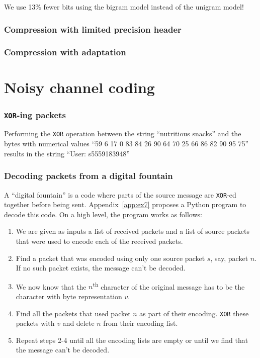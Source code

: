 \documentclass[10pt,a4paper,oneside,onecolumn]{article}
\newcommand*{\XOR}{{\tt XOR}\xspace}
\begin{document}
We use 13\% fewer bits using the bigram model instead of the unigram model!

\section{Compression with limited precision header}\label{sec:ex4}
\section{Compression with adaptation}\label{sec:ex5}


\part{Noisy channel coding}

\section{\XOR-ing packets}\label{sec:ex6}

Performing the \XOR operation between the string ``nutritious snacks'' and the
bytes with numerical values ``59 6 17 0 83 84 26 90 64 70 25 66 86 82 90 95 75''
results in the string ``User: s5559183948''

\section{Decoding packets from a digital fountain}\label{sec:ex7}

A ``digital fountain'' is a code where parts of the source message are \XOR-ed
together before being sent. Appendix~\ref{app:ex7} proposes a Python program to
decode this code. On a high level, the program works as follows:

\begin{enumerate}
\item We are given as inputs a list of received packets and a list of source
      packets that were used to encode each of the received packets.
\item Find a packet that was encoded using only one source packet $s$, say,
      packet $n$.  If no such packet exists, the message can't be decoded.
\item We now know that the $n$\textsuperscript{th} character of the original
      message has to be the character with byte representation $v$.
\item Find all the packets that used packet $n$ as part of their encoding.
      \XOR these packets with $v$ and delete $n$ from their encoding list.
\item Repeat steps 2-4 until all the encoding lists are empty or until we find
      that the message can't be decoded.
\end{enumerate}
\end{document}
